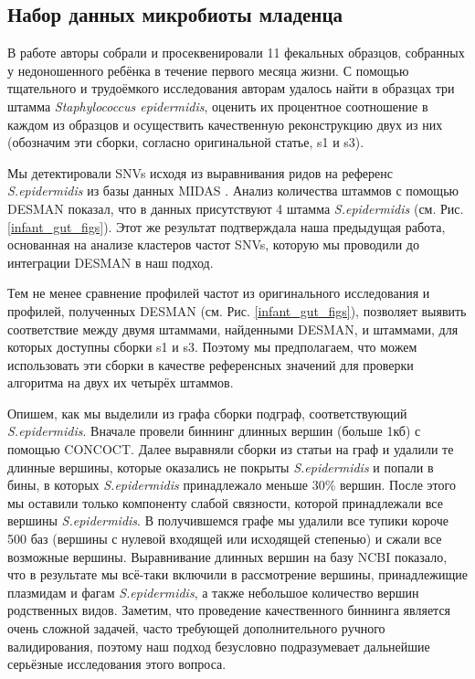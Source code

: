\documentclass{spbau-diploma}
\begin{document}


\subsection{Набор данных микробиоты младенца} \label{infant_gut_section}

В работе \cite{infant_gut} авторы собрали и просеквенировали 11 фекальных образцов, собранных у недоношенного ребёнка в течение первого месяца жизни. С помощью тщательного и трудоёмкого исследования авторам удалось найти в образцах три штамма \textit{Staphylococcus epidermidis}, оценить их процентное соотношение в каждом из образцов и осуществить качественную реконструкцию двух из них (обозначим эти сборки, согласно оригинальной статье, s1 и s3).

Мы детектировали SNVs исходя из выравнивания ридов на референс \textit{S.epidermidis} из базы данных MIDAS \cite{midas}. Анализ количества штаммов с помощью DESMAN показал, что в данных присутствуют 4 штамма \textit{S.epidermidis} (см. Рис. \ref{infant_gut_figs}). Этот же результат подтверждала наша предыдущая работа, основанная на анализе кластеров частот SNVs, которую мы проводили до интеграции DESMAN в наш подход.

Тем не менее сравнение профилей частот из оригинального исследования и профилей, полученных DESMAN (см. Рис. \ref{infant_gut_figs}), позволяет выявить соответствие между двумя штаммами, найденными DESMAN, и штаммами, для которых доступны сборки s1 и s3. Поэтому мы предполагаем, что можем использовать эти сборки в качестве референсных значений для проверки алгоритма на двух их четырёх штаммов.

Опишем, как мы выделили из графа сборки подграф, соответствующий \textit{S.epidermidis}. Вначале провели биннинг длинных вершин (больше 1кб) с помощью CONCOCT. Далее выравняли сборки из статьи на граф и удалили те длинные вершины, которые оказались не покрыты \textit{S.epidermidis} и попали в бины, в которых \textit{S.epidermidis} принадлежало меньше 30\% вершин. После этого мы оставили только компоненту слабой связности, которой принадлежали все вершины \textit{S.epidermidis}. В получившемся графе мы удалили все тупики  короче 500 баз (вершины с нулевой входящей или исходящей степенью) и сжали все возможные вершины. Выравнивание длинных вершин на базу NCBI показало, что в результате мы всё-таки включили в рассмотрение вершины, принадлежищие плазмидам и фагам \textit{S.epidermidis}, а также небольшое количество вершин родственных видов. Заметим, что проведение качественного биннинга является очень сложной задачей, часто требующей дополнительного ручного валидирования, поэтому наш подход безусловно подразумевает дальнейшие серьёзные исследования этого вопроса.
\end{document}
